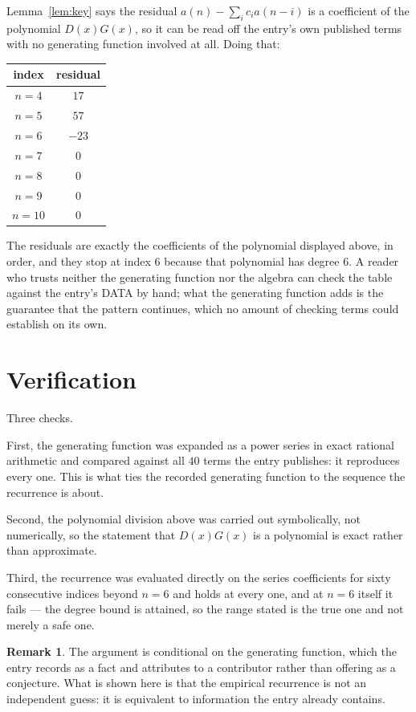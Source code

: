 \documentclass[11pt,a4paper]{article}
\theoremstyle{plain}
\theoremstyle{definition}
\newtheorem{remark}[theorem]{Remark}
\begin{document}
Lemma~\ref{lem:key} says the residual $a(n)-\sum_ic_ia(n-i)$ is a coefficient of the
polynomial $D(x)G(x)$, so it can be read off the entry's own published terms with no
generating function involved at all. Doing that:
\begin{center}
\begin{tabular}{cc}
index & residual \\ \hline
$n=4$ & $17$ \\
$n=5$ & $57$ \\
$n=6$ & $-23$ \\
$n=7$ & $0$ \\
$n=8$ & $0$ \\
$n=9$ & $0$ \\
$n=10$ & $0$
\end{tabular}
\end{center}
The residuals are exactly the coefficients of the polynomial displayed above, in order, and
they stop at index $6$ because that polynomial has degree $6$. A reader who trusts
neither the generating function nor the algebra can check the table against the entry's DATA
by hand; what the generating function adds is the guarantee that the pattern continues, which
no amount of checking terms could establish on its own.

\section{Verification}

Three checks.

First, the generating function was expanded as a power series in exact rational arithmetic and
compared against all $40$ terms the entry publishes: it reproduces every one. This is
what ties the recorded generating function to the sequence the recurrence is about.

Second, the polynomial division above was carried out symbolically, not numerically, so the
statement that $D(x)G(x)$ is a polynomial is exact rather than approximate.

Third, the recurrence was evaluated directly on the series coefficients for sixty consecutive
indices beyond $n=6$ and holds at every one, and at $n=6$ itself it fails --- the
degree bound is attained, so the range stated is the true one and not merely a safe one.

\begin{remark}
The argument is conditional on the generating function, which the entry records as a fact and
attributes to a contributor rather than offering as a conjecture. What is shown here is that
the empirical recurrence is not an independent guess: it is equivalent to information the
entry already contains.
\end{remark}
\end{document}
